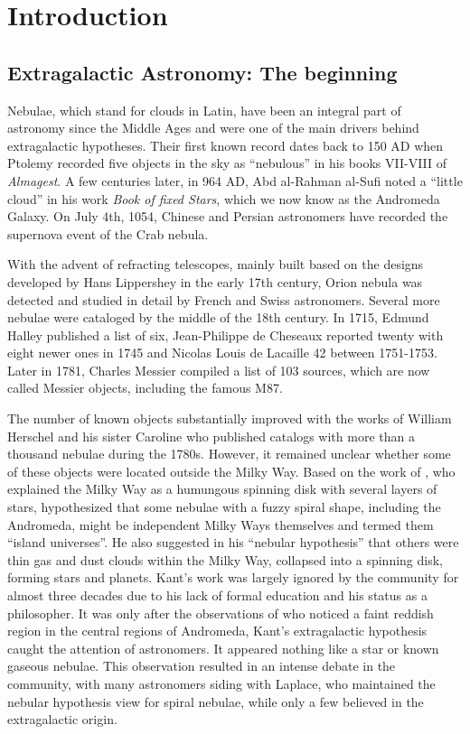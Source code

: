\renewcommand{\thechapter}{1}

\chapter{Introduction}

\section{Extragalactic Astronomy: The beginning}
Nebulae, which stand for clouds in Latin, have been an integral part of astronomy since the Middle Ages and were one of the main drivers behind extragalactic hypotheses. Their first known record dates back to 150 AD when Ptolemy recorded five objects in the sky as ``nebulous'' in his books VII-VIII  of \textit{Almagest}. A few centuries later, in 964 AD, Abd al-Rahman al-Sufi noted a ``little cloud'' in his work \textit{Book of fixed Stars}, which we now know as the Andromeda Galaxy. On July 4th, 1054, Chinese and Persian astronomers have recorded the supernova event of the Crab nebula.

With the advent of refracting telescopes, mainly built based on the designs developed by Hans Lippershey in the early 17th century, Orion nebula was detected and studied in detail by French and Swiss astronomers. Several more nebulae were cataloged by the middle of the 18th century. In 1715, Edmund Halley published a list of six, Jean-Philippe de Cheseaux reported twenty with eight newer ones in 1745 and Nicolas Louis de Lacaille 42 between 1751-1753. Later in 1781, Charles Messier compiled a list of 103 sources, which are now called Messier objects, including the famous M87.

The number of known objects substantially improved with the works of William Herschel and his sister Caroline who published catalogs with more than a thousand nebulae during the 1780s. However, it remained unclear whether some of these objects were located outside the Milky Way. Based on the work of \cite{wright1750original}, who explained the Milky Way as a humungous spinning disk with several layers of stars, \cite{kant1797allgemeine} hypothesized that some nebulae with a fuzzy spiral shape, including the Andromeda, might be independent Milky Ways themselves and termed them ``island universes''. He also suggested in his ``nebular hypothesis'' that others were thin gas and dust clouds within the Milky Way, collapsed into a spinning disk, forming stars and planets. Kant's work was largely ignored by the community for almost three decades due to his lack of formal education and his status as a philosopher. It was only after the observations of \cite{10.2307/106755} who noticed a faint reddish region in the central regions of Andromeda, Kant's extragalactic hypothesis caught the attention of astronomers. It appeared nothing like a star or known gaseous nebulae. This observation resulted in an intense debate in the community, with many astronomers siding with Laplace, who maintained the nebular hypothesis view for spiral nebulae, while only a few believed in the extragalactic origin. 

